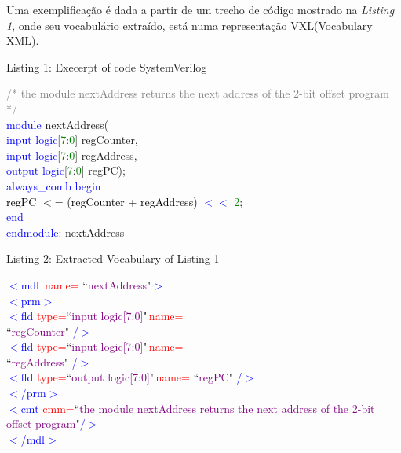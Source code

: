 \documentclass[12pt, twocolumn, a4paper]{article}
\begin{document}
Uma exemplificação é dada a partir de um trecho de código mostrado na \textit{Listing 1}, onde seu vocabulário extraído, está numa representação VXL(Vocabulary XML).
\begin{center}
{\footnotesize Listing 1: Execerpt of code SystemVerilog}
\end{center}
{\footnotesize
\textcolor{gray}{/* the module nextAddress returns the}
\textcolor{gray}{next address of the 2-bit offset program}
\textcolor{gray}{*/}\\
\textcolor{blue}{module} nextAddress(\\\textcolor{blue}{\qquad input logic}[\textcolor{green}{7}:\textcolor{green}{0}] regCounter,\\ \textcolor{blue}{\qquad input logic}[\textcolor{green}{7}:\textcolor{green}{0}] regAddress,\\
\textcolor{blue}{\qquad output logic}[\textcolor{green}{7}:\textcolor{green}{0}] regPC);\\
\textcolor{blue}{\quad always\_comb begin}\\
\textcolor{black}{\qquad regPC $<$= (regCounter + regAddress)} \textcolor{blue}{$<<$} \textcolor{green}{2};\\
\textcolor{blue}{\quad end}\\
\textcolor{blue}{endmodule}: nextAddress\\
\begin{center}
{\footnotesize Listing 2: Extracted Vocabulary of Listing 1}
\end{center}}
{\footnotesize
\textcolor{blue}{$<$mdl} \textcolor{red}{\,name=} ``\textcolor{purple}{nextAddress}"\textcolor{blue}{$>$}\\
\textcolor{blue}{\quad$<$prm$>$}\\
\textcolor{blue}{\qquad$<$fld} \textcolor{red}{type=}``\textcolor{purple}{input logic[7:0]}"\textcolor{red}{\,name=}\\\textcolor{black}{\qquad ``}\textcolor{purple}{regCounter}" \textcolor{blue}{/$>$}\\
\textcolor{blue}{\qquad$<$fld} \textcolor{red}{type=}``\textcolor{purple}{input logic[7:0]}"\textcolor{red}{\,name=}\\\textcolor{black}{\qquad ``}\textcolor{purple}{regAddress}" \textcolor{blue}{/$>$}\\
\textcolor{blue}{\qquad$<$fld} \textcolor{red}{type=}``\textcolor{purple}{output logic[7:0]}"\textcolor{red}{\,name=} ``\textcolor{purple}{regPC}" \textcolor{blue}{/$>$}\\
\textcolor{blue}{\quad$<$/prm$>$}\\
\textcolor{blue}{\quad$<$cmt} \textcolor{red}{cmm=}``\textcolor{purple}{the module nextAddress returns the next address of the 2-bit offset program}"\textcolor{blue}{/$>$}\\
\textcolor{blue}{$<$/mdl$>$}}\\
\end{document}

